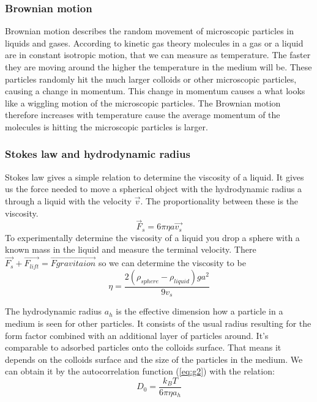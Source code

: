 \documentclass[]{article}
\begin{document}
\subsubsection{Brownian motion}
Brownian motion describes the random movement of microscopic particles in liquids and gases. According to kinetic gas theory molecules in a gas or a liquid are in constant isotropic motion, that we can measure as temperature. The faster they are moving around the higher the temperature in the medium will be. These particles randomly hit the much larger colloids or other microscopic particles, causing a change in momentum. This change in momentum causes a what looks like a wiggling motion of the microscopic particles. The Brownian motion therefore increases with temperature cause the average momentum of the molecules is hitting the microscopic particles is larger.


\subsubsection{Stokes law and hydrodynamic radius}
Stokes law gives a simple relation to determine the viscosity of a liquid. It gives us the force needed to move a spherical object with the hydrodynamic radius a through a liquid with the velocity $\vec{v}$. The proportionality between these is the viscosity.
\begin{equation}\label{eq:Stokes}
	\vec{F}_s=6 \pi \eta a \vec{v_s}
\end{equation}
To experimentally determine the viscosity of a liquid you drop a sphere with a known mass in the liquid and measure the terminal velocity. There $\vec{F_s}+\vec{F_{lift}}=\vec{F{gravitaion}}$ so we can determine the viscosity to be
\begin{equation}
	\eta=\frac{2(\rho_{sphere}-\rho_{liquid})g  a^2}{9v_s}
\end{equation} 

The hydrodynamic radius $a_h$ is the effective dimension how a particle in a medium is seen for other particles. It consists of the usual radius resulting for the form factor combined with an additional layer of particles around. It's comparable to adsorbed particles onto the colloids surface. That means it depends on the colloids surface and the size of the particles in the medium. We can obtain it by the autocorrelation function (\ref{eq:g2}) with the relation: 
\begin{equation}\label{eq:D0}
D_0 = \frac{k_BT}{6\pi\eta a_h}
\end{equation}
\end{document}
